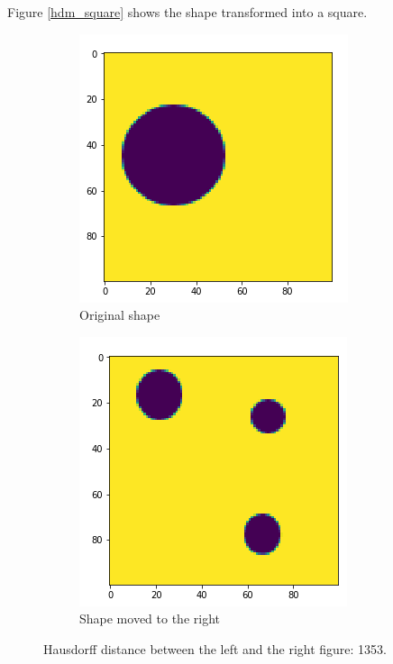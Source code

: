 Figure \ref{hdm_square} shows the shape transformed into a square. 


\begin{figure}[H]
    \centering
    \begin{subfigure}{.5\textwidth}
        \centering
        \includegraphics[width=.75\linewidth]{chapters/06_hdm/images/hdm_original.png}
        \caption{Original shape}
    \end{subfigure}%
    \begin{subfigure}{.5\textwidth}
        \centering
        \includegraphics[width=.75\linewidth]{chapters/06_hdm/images/hdm_smaller_circles.png}
        \caption{Shape moved to the right}
    \end{subfigure}
    \caption{Hausdorff distance between the left and the right figure: 1353. }
    \label{hdm_smaller_circles}
\end{figure}
